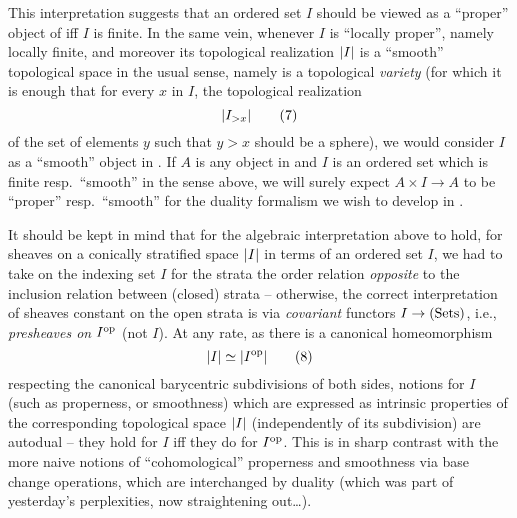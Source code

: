 This interpretation suggests that an ordered set $I$ should be viewed
as a ``proper'' object of \Cat{} if{f} $I$ is finite. In the same
vein, whenever $I$ is ``locally proper'', namely locally finite, and
moreover its topological realization $\lvert I\rvert$ is a ``smooth''
topological space in the usual sense, namely is a topological
\emph{variety} (for which it is enough that for every $x$ in $I$, the
topological realization
\begin{equation}
  \label{eq:137.7}
  \lvert I_{>x}\rvert\tag{7}
\end{equation}
of the set of elements $y$ such that $y>x$ should be a sphere), we
would consider $I$ as a ``smooth'' object in \Cat. If $A$ is any
object in \Cat{} and $I$ is an ordered set which is finite resp.\
``smooth'' in the sense above, we will surely expect $A\times I\to A$
to be ``proper'' resp.\ ``smooth'' for the duality formalism we wish
to develop in \Cat.

It should be kept in mind that for the algebraic interpretation above
to hold, for sheaves on a conically stratified space $\lvert I\rvert$ in terms
of an ordered set $I$, we had to take on the indexing set $I$ for the
strata the order relation \emph{opposite} to the inclusion relation
between (closed) strata -- otherwise, the correct interpretation of
sheaves constant on the open strata is via \emph{covariant} functors
$I\to{\ensuremath{(\mathrm{Sets})}}$, i.e., \emph{presheaves on $I^{\mathrm{op}}$} (not $I$). At any rate,
as there is a canonical homeomorphism
\begin{equation}
  \label{eq:137.8}
  \lvert I\rvert\simeq\lvert I^{\mathrm{op}}\rvert\tag{8}
\end{equation}
respecting the canonical barycentric subdivisions of both sides,
notions for $I$ (such as properness, or smoothness) which are
expressed as intrinsic properties of the corresponding topological
space $\lvert I\rvert$ (independently of its subdivision) are autodual -- they
hold for $I$ if{f} they do for $I^{\mathrm{op}}$.\pspage{575} This is in sharp
contrast with the more naive notions of ``cohomological'' properness
and smoothness via base change operations, which are interchanged by
duality (which was part of yesterday's perplexities, now straightening
out\dots).

